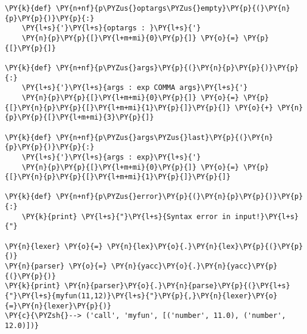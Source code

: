 \begin{Verbatim}[commandchars=\\\{\}]
\PY{k}{def} \PY{n+nf}{p\PYZus{}optargs\PYZus{}empty}\PY{p}{(}\PY{n}{p}\PY{p}{)}\PY{p}{:}
    \PY{l+s}{'}\PY{l+s}{optargs : }\PY{l+s}{'}
    \PY{n}{p}\PY{p}{[}\PY{l+m+mi}{0}\PY{p}{]} \PY{o}{=} \PY{p}{[}\PY{p}{]}

\PY{k}{def} \PY{n+nf}{p\PYZus{}args}\PY{p}{(}\PY{n}{p}\PY{p}{)}\PY{p}{:}
    \PY{l+s}{'}\PY{l+s}{args : exp COMMA args}\PY{l+s}{'}
    \PY{n}{p}\PY{p}{[}\PY{l+m+mi}{0}\PY{p}{]} \PY{o}{=} \PY{p}{[}\PY{n}{p}\PY{p}{[}\PY{l+m+mi}{1}\PY{p}{]}\PY{p}{]} \PY{o}{+} \PY{n}{p}\PY{p}{[}\PY{l+m+mi}{3}\PY{p}{]}

\PY{k}{def} \PY{n+nf}{p\PYZus{}args\PYZus{}last}\PY{p}{(}\PY{n}{p}\PY{p}{)}\PY{p}{:}
    \PY{l+s}{'}\PY{l+s}{args : exp}\PY{l+s}{'}
    \PY{n}{p}\PY{p}{[}\PY{l+m+mi}{0}\PY{p}{]} \PY{o}{=} \PY{p}{[}\PY{n}{p}\PY{p}{[}\PY{l+m+mi}{1}\PY{p}{]}\PY{p}{]}

\PY{k}{def} \PY{n+nf}{p\PYZus{}error}\PY{p}{(}\PY{n}{p}\PY{p}{)}\PY{p}{:}
    \PY{k}{print} \PY{l+s}{"}\PY{l+s}{Syntax error in input!}\PY{l+s}{"}

\PY{n}{lexer} \PY{o}{=} \PY{n}{lex}\PY{o}{.}\PY{n}{lex}\PY{p}{(}\PY{p}{)}
\PY{n}{parser} \PY{o}{=} \PY{n}{yacc}\PY{o}{.}\PY{n}{yacc}\PY{p}{(}\PY{p}{)}
\PY{k}{print} \PY{n}{parser}\PY{o}{.}\PY{n}{parse}\PY{p}{(}\PY{l+s}{"}\PY{l+s}{myfun(11,12)}\PY{l+s}{"}\PY{p}{,}\PY{n}{lexer}\PY{o}{=}\PY{n}{lexer}\PY{p}{)}
\PY{c}{\PYZsh{}--> ('call', 'myfun', [('number', 11.0), ('number', 12.0)])}
\end{Verbatim}
